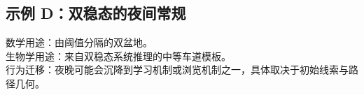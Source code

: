 \subsection*{示例 D：双稳态的夜间常规}

数学用途：由阈值分隔的双盆地。\\
生物学用途：来自双稳态系统推理的中等车道模板。\\
行为迁移：夜晚可能会沉降到学习机制或浏览机制之一，具体取决于初始线索与路径几何。
